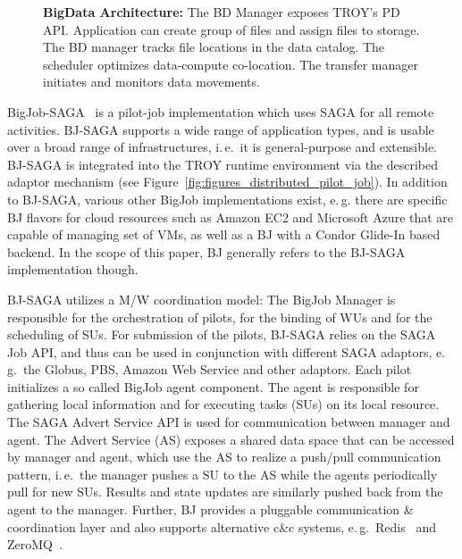 \documentclass[conference,final]{IEEEtran}
\newcommand{\up}{\vspace*{-1em}}
\begin{document}
\begin{figure}[t]
\begin{minipage}[t]{0.475\linewidth}
    \caption{\textbf{BigData Architecture:} The BD Manager exposes
      TROY's PD API. Application can create group of files and assign 
      files to storage. The BD manager tracks file locations in
      the data catalog. The scheduler optimizes data-compute co-location.
      The transfer manager initiates and monitors data movements. \up\up}
	\label{fig:pilot-data-architecture}
	\end{minipage}
\end{figure}



BigJob-SAGA~\cite{bigjob_web,saga_bigjob_condor_cloud} is a pilot-job
implementation which uses SAGA for all remote activities. BJ-SAGA supports a
wide range of application types, and is usable over a broad range of
infrastructures, i.\,e.\ it is general-purpose and extensible. BJ-SAGA is
integrated into the TROY runtime environment via the described adaptor mechanism (see
Figure~\ref{fig:figures_distributed_pilot_job}). In addition to BJ-SAGA, various
other BigJob implementations exist, e.\,g. there are specific BJ flavors for
cloud resources such as Amazon EC2 and Microsoft Azure that are capable of
managing set of VMs, as well as a BJ with a Condor Glide-In based backend. In
the scope of this paper, BJ generally refers to the BJ-SAGA implementation
though.

BJ-SAGA utilizes a M/W coordination model: The BigJob Manager is responsible for
the orchestration of pilots, for the binding of WUs and for the scheduling of
SUs. For submission of the pilots, BJ-SAGA relies on the SAGA Job API, and
thus can be used in conjunction with different SAGA adaptors, e.\,g.\ the
Globus, PBS, Amazon Web Service and other adaptors. Each pilot initializes a so
called BigJob agent component. The agent is responsible for gathering local
information and for executing tasks (SUs) on its local resource. The SAGA Advert
Service API is used for communication between manager and agent. The Advert
Service (AS) exposes a shared data space that can be accessed by manager and
agent, which use the AS to realize a push/pull communication pattern,
i.\,e.\ the manager pushes a SU to the AS while the agents periodically pull for
new SUs. Results and state updates are similarly pushed back from the agent to 
the manager. Further, BJ provides a pluggable communication \& coordination 
layer and also supports alternative c\&c systems, e.\,g.\ Redis~\cite{redis} and 
ZeroMQ~\cite{zmq}.
\end{document}
